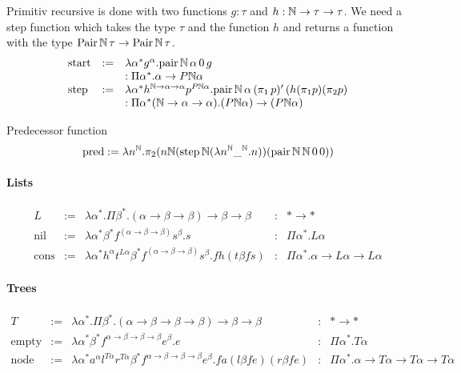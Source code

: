 Primitiv recursive is done with two functions $g:\tau$ and
$h:\mathbb{N} \to \tau \to \tau$. We need a step function which takes the type
$\tau$ and the function $h$ and returns a function with the type
$\text{Pair}\,\mathbb{N}\,\tau \to \text{Pair}\,\mathbb{N}\,\tau$.
$$
\begin{array}{lll}
  \text{start}
  &:=& \lambda
       \alpha^*
       g^\alpha
       . \text{pair}\,\mathbb{N}\,\alpha\,0\,g
  \\
  & &: \Pi \alpha^*. \alpha \to P\mathbb{N}\alpha
  \\
  \text{step}
  &:=& \lambda
       \alpha^*
       h^{\mathbb{N}\to\alpha\to\alpha}
       p^{P\mathbb{N}\alpha}
       . \text{pair}\,\mathbb{N}\,\alpha\,
       (\pi_1\,p)'\,
       (h (\pi_1 p) (\pi_2 p)
  \\
  & &: \Pi \alpha^* (\mathbb{N}\to\alpha\to\alpha)
      . (P\mathbb{N}\alpha)\to (P\mathbb{N}\alpha)
\end{array}
$$


Predecessor function
$$
\text{pred} :=
\lambda n^{\mathbb{N}}.
\pi_2 (
  n
  \mathbb{N} (\text{step}\,\mathbb{N} (\lambda n^{\mathbb{N}} \_^{\mathbb{N}}. n))
  (\text{pair}\,\mathbb{N}\,\mathbb{N}\,0\,0)
)
$$



\paragraph{Lists}

$$
\begin{array}{lllll}
  L
  &:=& \lambda \alpha^* .
       \Pi \beta^* . (\alpha\to\beta\to\beta) \to \beta \to \beta
  &:& * \to *
  \\
  \text{nil}
  &:=& \lambda \alpha^* \beta^* f^{(\alpha\to\beta\to\beta)} s^\beta . s
  &:& \Pi \alpha^* . L \alpha
  \\
  \text{cons}
  &:=& \lambda
       \alpha^*
       h^\alpha
       t^{L\alpha}
       \beta^*
       f^{(\alpha\to\beta\to\beta)}
       s^\beta
       . f h (t \beta f s)
  &:& \Pi \alpha^* . \alpha \to L \alpha \to L \alpha
\end{array}
$$




\paragraph{Trees}

$$
\begin{array}{lllll}
  T
  &:=& \lambda \alpha^* .
       \Pi \beta^* . (\alpha\to\beta\to\beta\to\beta) \to \beta \to \beta
  &:& * \to *
  \\
  \text{empty}
  &:=& \lambda \alpha^* \beta^* f^{\alpha\to\beta\to\beta\to\beta} e^\beta . e
  &:& \Pi \alpha^* . T \alpha
  \\
  \text{node}
  &:=& \lambda
       \alpha^*
       a^\alpha
       l^{T\alpha}
       r^{T\alpha}
       \beta^*
       f^{\alpha\to\beta\to\beta\to\beta}
       e^\beta
       . f a (l \beta f e) (r \beta f e)
  &:& \Pi \alpha^* . \alpha \to T \alpha \to T \alpha \to T \alpha
\end{array}
$$

